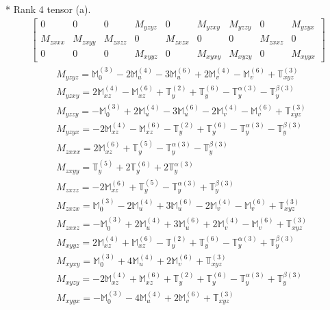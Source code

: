 \documentclass[fleqn,8pt,landscape]{jsarticle}
\begin{document}
* Rank 4 tensor (a).
\begin{align*}
\begin{bmatrix} 0 & 0 & 0 & M_{yzyz} & 0 & M_{yzxy} & M_{yzzy} & 0 & M_{yzyx} \\ M_{zxxx} & M_{zxyy} & M_{zxzz} & 0 & M_{zxzx} & 0 & 0 & M_{zxxz} & 0 \\ 0 & 0 & 0 & M_{xyyz} & 0 & M_{xyxy} & M_{xyzy} & 0 & M_{xyyx} \end{bmatrix}
\end{align*}
\begin{align*}
& M_{yzyz} = \mathbb{M}_{0}^{(3)} - 2 \mathbb{M}_{u}^{(4)} - 3 \mathbb{M}_{u}^{(6)} + 2 \mathbb{M}_{v}^{(4)} - \mathbb{M}_{v}^{(6)} + \mathbb{T}_{xyz}^{(3)} \\
& M_{yzxy} = 2 \mathbb{M}_{xz}^{(4)} - \mathbb{M}_{xz}^{(6)} + \mathbb{T}_{y}^{(2)} + \mathbb{T}_{y}^{(6)} - \mathbb{T}_{y}^{\alpha(3)} - \mathbb{T}_{y}^{\beta(3)} \\
& M_{yzzy} = - \mathbb{M}_{0}^{(3)} + 2 \mathbb{M}_{u}^{(4)} - 3 \mathbb{M}_{u}^{(6)} - 2 \mathbb{M}_{v}^{(4)} - \mathbb{M}_{v}^{(6)} + \mathbb{T}_{xyz}^{(3)} \\
& M_{yzyx} = - 2 \mathbb{M}_{xz}^{(4)} - \mathbb{M}_{xz}^{(6)} - \mathbb{T}_{y}^{(2)} + \mathbb{T}_{y}^{(6)} - \mathbb{T}_{y}^{\alpha(3)} - \mathbb{T}_{y}^{\beta(3)} \\
& M_{zxxx} = 2 \mathbb{M}_{xz}^{(6)} + \mathbb{T}_{y}^{(5)} - \mathbb{T}_{y}^{\alpha(3)} - \mathbb{T}_{y}^{\beta(3)} \\
& M_{zxyy} = \mathbb{T}_{y}^{(5)} + 2 \mathbb{T}_{y}^{(6)} + 2 \mathbb{T}_{y}^{\alpha(3)} \\
& M_{zxzz} = - 2 \mathbb{M}_{xz}^{(6)} + \mathbb{T}_{y}^{(5)} - \mathbb{T}_{y}^{\alpha(3)} + \mathbb{T}_{y}^{\beta(3)} \\
& M_{zxzx} = \mathbb{M}_{0}^{(3)} - 2 \mathbb{M}_{u}^{(4)} + 3 \mathbb{M}_{u}^{(6)} - 2 \mathbb{M}_{v}^{(4)} - \mathbb{M}_{v}^{(6)} + \mathbb{T}_{xyz}^{(3)} \\
& M_{zxxz} = - \mathbb{M}_{0}^{(3)} + 2 \mathbb{M}_{u}^{(4)} + 3 \mathbb{M}_{u}^{(6)} + 2 \mathbb{M}_{v}^{(4)} - \mathbb{M}_{v}^{(6)} + \mathbb{T}_{xyz}^{(3)} \\
& M_{xyyz} = 2 \mathbb{M}_{xz}^{(4)} + \mathbb{M}_{xz}^{(6)} - \mathbb{T}_{y}^{(2)} + \mathbb{T}_{y}^{(6)} - \mathbb{T}_{y}^{\alpha(3)} + \mathbb{T}_{y}^{\beta(3)} \\
& M_{xyxy} = \mathbb{M}_{0}^{(3)} + 4 \mathbb{M}_{u}^{(4)} + 2 \mathbb{M}_{v}^{(6)} + \mathbb{T}_{xyz}^{(3)} \\
& M_{xyzy} = - 2 \mathbb{M}_{xz}^{(4)} + \mathbb{M}_{xz}^{(6)} + \mathbb{T}_{y}^{(2)} + \mathbb{T}_{y}^{(6)} - \mathbb{T}_{y}^{\alpha(3)} + \mathbb{T}_{y}^{\beta(3)} \\
& M_{xyyx} = - \mathbb{M}_{0}^{(3)} - 4 \mathbb{M}_{u}^{(4)} + 2 \mathbb{M}_{v}^{(6)} + \mathbb{T}_{xyz}^{(3)}
\end{align*}
\end{document}
